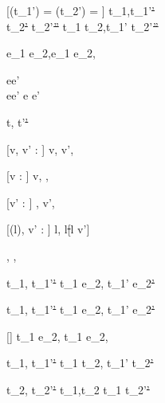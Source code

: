 [\Value(t_1') = \bot \land \Value(t_2') = \bot]
  {t_1,\Sigma  \normalise t_1'\st{'} \\
   t_2\st{'} \normalise t_2'\st{''}}
  {t_1 \Or t_2,\Sigma \normalise t_1' \Or t_2'\st{''}}


  { }
  {e_1 \Xor e_2,\Sigma \normalise e_1 \Xor e_2,\Sigma}

    {e\evaluate e' \\
    e\neq e'}
    {e \normalise e'}








  {t,\Sigma {} t'\st{'}}


[v, v' : \beta]
  { }
  {\Edit v,\Sigma {} \Edit v',\Sigma}

[v : \beta]
  { }
  {\Edit v,\Sigma \handle{\Empty} \Enter \beta,\Sigma}

[v' : \beta]
  { }
  {\Enter \beta,\Sigma {} \Edit v',\Sigma}

[\Sigma(l), v' : \beta]
  { }
  {\Update l,\Sigma {} \Update l\st[l \mapsto v']{}}


  { }
  {\Fail,\Sigma {} \Fail,\Sigma}


  {t_1,\Sigma {} t_1'\st{'}}
  {t_1 \Then e_2,\Sigma {} t_1' \Then e_2\st{'}}

  {t_1,\Sigma {} t_1'\st{'}}
  {t_1 \Next e_2,\Sigma {} t_1' \Next e_2\st{'}}

[\neq \bot \wedge \neg{}]
  { }
  {t_1 \Next e_2,\Sigma \handle{\Continue} t_1 \Then e_2,\Sigma}


  {t_1,\Sigma {} t_1'\st{'} }
  {t_1 \And t_2,\Sigma {} t_1' \And t_2\st{'}}

  {t_2,\Sigma {} t_2'\st{'} }
  {t_1,\Sigma \And t_2  t_1 \And t_2'\st{'}}


